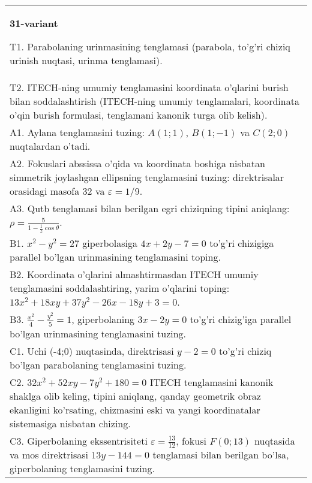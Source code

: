 \documentclass{article}
\begin{document}
\begin{tabular}{m{17cm}}
\textbf{31-variant}
\newline

T1. Parabolaning urinmasining tenglamasi (parabola, to'g'ri chiziq urinish nuqtasi, urinma tenglamasi).\\

T2. ITECH-ning umumiy tenglamasini koordinata o'qlarini burish bilan soddalashtirish (ITECH-ning umumiy tenglamalari, koordinata o'qin burish formulasi, tenglamani kanonik turga olib kelish).\\

A1. Aylana tenglamasini tuzing: $A(1;1)$, $B(1;-1)$ va $C(2;0)$ nuqtalardan o'tadi.\\

A2. Fokuslari abssissa o'qida va koordinata boshiga nisbatan simmetrik joylashgan ellipsning tenglamasini tuzing: direktrisalar orasidagi masofa $32$ va $\varepsilon=1/9$.\\

A3. Qutb tenglamasi bilan berilgan egri chiziqning tipini aniqlang: $\rho=\frac{5}{1-\frac{1}{2}\cos\theta}$.\\

B1. $x^{2} - y^{2} = 27$ giperbolasiga $4x + 2y - 7 = 0$ to'g'ri chizigiga parallel bo'lgan urinmasining tenglamasini toping.  \\

B2. Koordinata o'qlarini almashtirmasdan ITECH umumiy tenglamasini soddalashtiring, yarim o'qlarini toping: $13x^{2} + 18xy + 37y^{2} - 26x - 18y + 3 = 0$.  \\

B3. $\frac{x^{2}}{4} - \frac{y^{2}}{5} = 1$, giperbolaning $3x - 2y = 0$ to'g'ri chizig'iga parallel bo'lgan urinmasining tenglamasini tuzing.  \\

C1. Uchi (-4;0) nuqtasinda, direktrisasi $y - 2 = 0$ to'g'ri chiziq bo'lgan parabolaning tenglamasini tuzing.\\

C2. $32x^{2} + 52xy - 7y^{2} + 180 = 0$ ITECH tenglamasini kanonik shaklga olib keling, tipini aniqlang, qanday geometrik obraz ekanligini ko'rsating, chizmasini eski va yangi koordinatalar sistemasiga nisbatan chizing.  \\

C3. Giperbolaning ekssentrisiteti $\varepsilon = \frac{13}{12}$, fokusi $F(0;13)$ nuqtasida va mos direktrisasi $13y - 144 = 0$ tenglamasi bilan berilgan bo'lsa, giperbolaning tenglamasini tuzing.  \\

\end{tabular}
\vspace{1cm}
\end{document}
